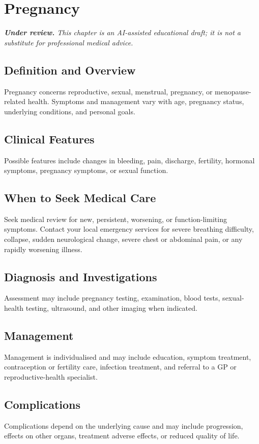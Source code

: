 \chapter{Pregnancy}

\medskip
\noindent\textit{\textbf{Under review.} This chapter is an AI-assisted educational draft; it is not a substitute for professional medical advice.}

\section*{Definition and Overview}
Pregnancy concerns reproductive, sexual, menstrual, pregnancy, or menopause-related health. Symptoms and management vary with age, pregnancy status, underlying conditions, and personal goals.

\section*{Clinical Features}
Possible features include changes in bleeding, pain, discharge, fertility, hormonal symptoms, pregnancy symptoms, or sexual function.

\section*{When to Seek Medical Care}
Seek medical review for new, persistent, worsening, or function-limiting symptoms. Contact your local emergency services for severe breathing difficulty, collapse, sudden neurological change, severe chest or abdominal pain, or any rapidly worsening illness.

\section*{Diagnosis and Investigations}
Assessment may include pregnancy testing, examination, blood tests, sexual-health testing, ultrasound, and other imaging when indicated.

\section*{Management}
Management is individualised and may include education, symptom treatment, contraception or fertility care, infection treatment, and referral to a GP or reproductive-health specialist.

\section*{Complications}
Complications depend on the underlying cause and may include progression, effects on other organs, treatment adverse effects, or reduced quality of life.

